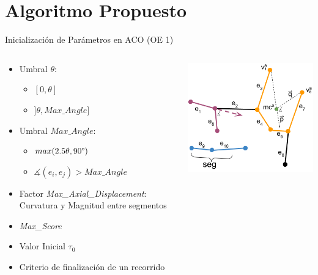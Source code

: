 \section{Algoritmo Propuesto}
\begin{frame}{Inicializaci\'on de Par\'ametros en ACO (OE 1)}
    \begin{columns}
        \hspace{-1cm}
        \begin{column}{0.45\textwidth}
            \begin{itemize} \fontsize{9pt}{5}\selectfont
                \item Umbral $\theta$: 
                \begin{itemize} \fontsize{9pt}{5}\selectfont
                    \item $[0, \theta]$
                    \item $]\theta, Max\_Angle]$
                \end{itemize}
                \item Umbral $Max\_Angle$: 
                \begin{itemize} \fontsize{9pt}{5}\selectfont
                    \item $max(2.5 \theta, 90\degree)$
                    \item $\measuredangle (e_{i}, e_{j})> Max\_Angle$
                \end{itemize}
                \item Factor {\it Max\_Axial\_Displacement}: Curvatura y Magnitud entre segmentos
                \item {\it Max\_Score}
                \item Valor Inicial $\tau_0$
                \item Criterio de finalizaci\'on de un recorrido
            \end{itemize}
        \end{column}
        \begin{column}{0.55\textwidth}
            \centering
            \includegraphics[scale=0.55]{Pictures/ant-params.png}

\end{column}
\end{columns}
\end{frame}
